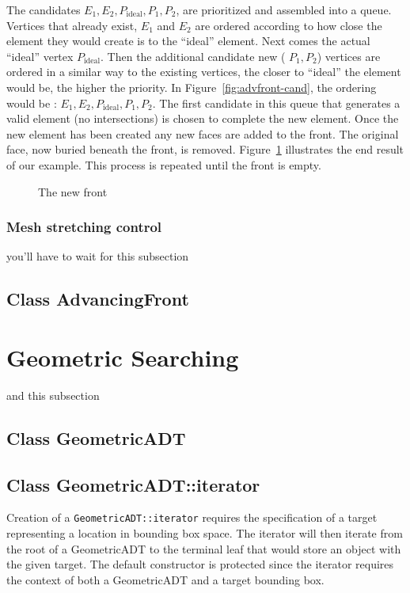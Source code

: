 \documentclass{article}
\begin{document}
The candidates $E_{1}, E_{2}, P_{\mbox{ideal}}, P_{1}, P_{2}$, are prioritized and 
assembled into a queue.  Vertices that already exist, $E_{1}$ and $E_{2}$ are ordered 
according to how close the element they would create is to the ``ideal'' element.
Next comes the actual ``ideal'' vertex $P_{\mbox{ideal}}$.  Then the additional
candidate new ( $P_{1}, P_{2}$) vertices are ordered in a similar way to the 
existing vertices, the closer to ``ideal'' the element would be, the higher the priority.  
In Figure~\ref{fig:advfront-cand}, the ordering would be : 
$E_{1}, E_{2}, P_{\mbox{ideal}}, P_{1}, P_{2}$.  The first candidate in this queue that
generates a valid element (no intersections) is chosen to complete the new element.  Once the new
element has been created any new faces are added to the front.  The
original face, now buried beneath the front, is removed.  Figure~\ref{fig:advfront-newfront} 
illustrates the end result of our example.  This process is repeated until the front is empty.
\begin{figure}
 \begin{center}
 \caption{The new front}\label{fig:advfront-newfront}
 \end{center}
\end{figure}	

\subsubsection{Mesh stretching control}
you'll have to wait for this subsection

\subsection{Class AdvancingFront}


\vfill\eject

\section{Geometric Searching}
and this subsection 
\subsection{Class GeometricADT}


\subsection{Class GeometricADT::iterator}
Creation of a {\tt GeometricADT::iterator} requires the specification of a 
target representing a location in bounding box space.  The iterator will then
iterate from the root of a GeometricADT to the terminal leaf that would store
an object with the given target.  The default constructor is protected since 
the iterator requires the context of both a GeometricADT and a target bounding
box. 

\end{document}
